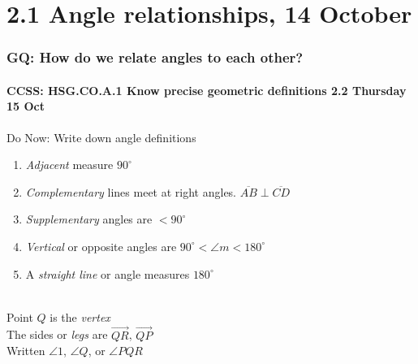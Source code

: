 \documentclass{beamer}
\begin{document}
  \section{2.1 Angle relationships, 14 October}
  \frame
  {
    \frametitle{GQ: How do we relate angles to each other?}
    \framesubtitle{CCSS: HSG.CO.A.1 Know precise geometric definitions  \hfill \alert{2.2 Thursday 15 Oct}}
  
    \begin{block}{Do Now: Write down angle definitions}
    \begin{enumerate}
        \item \emph{Adjacent} measure $90^\circ$
        \item \emph{Complementary} lines meet at right angles. $\overline{AB} \perp \overline{CD}$
        \item \emph{Supplementary} angles are $< 90^\circ$
        \item \emph{Vertical} or opposite angles are $90^\circ < \angle m < 180^\circ$
        \item A \emph{straight line} or angle measures $180^\circ$
    \end{enumerate}
    \end{block}
    \begin{multicols}{2}
     \\
    Point $Q$ is the \emph{vertex} \\[0.25cm]
    The sides or \emph{legs} are $\overrightarrow{QR}$, $\overrightarrow{QP}$ \\[0.25cm]
    Written $\angle 1$, $\angle Q$, or $\angle PQR$
  \end{multicols}
  }


  
\end{document}
